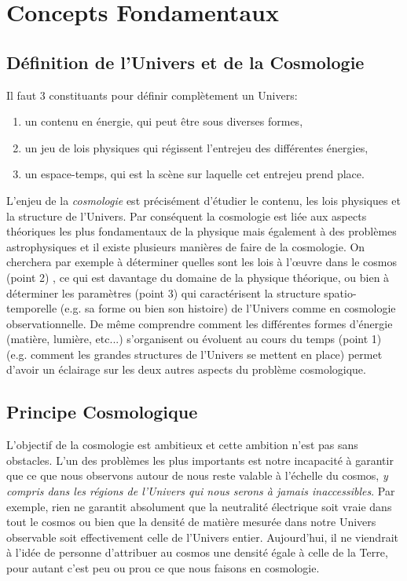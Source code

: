 
\chapter{Concepts Fondamentaux}

\section{Définition de l'Univers et de la Cosmologie}
\label{s:fond_def}
 Il faut 3 constituants pour définir complètement un Univers:
\begin{enumerate}
\item un contenu en énergie, qui peut être sous diverses formes,
\item un jeu de lois physiques qui régissent l'entrejeu des différentes énergies,
\item un espace-temps, qui est la scène sur laquelle cet entrejeu prend place.
\end{enumerate} 
L'enjeu de la \textit{cosmologie} est précisément d'étudier le contenu, les lois physiques et la structure de l'Univers. Par conséquent la cosmologie est liée aux aspects théoriques les plus fondamentaux de la physique mais également à des problèmes astrophysiques et il existe plusieurs manières de faire de la cosmologie. On cherchera par exemple à déterminer quelles sont les lois à l'œuvre dans le cosmos (point 2) , ce qui est davantage du domaine de la physique théorique, ou bien à déterminer les paramètres (point 3)  qui caractérisent la structure spatio-temporelle (e.g. sa forme ou bien son histoire) de l'Univers comme en cosmologie observationnelle. De même comprendre comment les différentes formes d'énergie (matière, lumière, etc...) s'organisent ou évoluent au cours du temps (point 1) (e.g. comment les grandes structures de l'Univers se mettent en place) permet d'avoir un éclairage sur les deux autres aspects du problème cosmologique.

\section{Principe Cosmologique}
L'objectif de la cosmologie est ambitieux et cette ambition n'est pas sans obstacles. L'un des problèmes les plus importants est notre incapacité à garantir que ce que nous observons autour de nous reste valable à l'échelle du cosmos, \textit{y compris dans les régions de l'Univers qui nous serons à jamais inaccessibles}. Par exemple, rien ne garantit absolument que la neutralité électrique soit vraie dans tout le cosmos ou bien que la densité de matière mesurée dans notre Univers observable soit effectivement celle de l'Univers entier. Aujourd'hui, il ne viendrait à l'idée de personne d'attribuer au cosmos une densité égale à celle de la Terre, pour autant c'est peu ou prou ce que nous faisons en cosmologie. 


